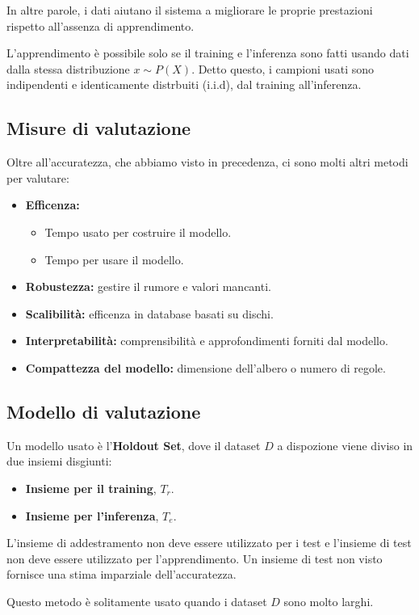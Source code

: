 In altre parole, i dati aiutano il sistema a migliorare le proprie prestazioni rispetto all'assenza di apprendimento.

\begin{note}
  L'apprendimento è possibile solo se il training e l'inferenza sono fatti usando dati dalla stessa distribuzione $x \sim P(X)$.
  Detto questo, i campioni usati sono indipendenti e identicamente distrbuiti (i.i.d), dal training all'inferenza.
\end{note}

\subsection{Misure di valutazione}
Oltre all'accuratezza, che abbiamo visto in precedenza, ci sono molti altri metodi per valutare:
\begin{itemize}
  \item \textbf{Efficenza:}
  \begin{itemize}
    \item Tempo usato per costruire il modello.
    \item Tempo per usare il modello.
  \end{itemize}
  \item \textbf{Robustezza:} gestire il rumore e valori mancanti.
  \item \textbf{Scalibilità:} efficenza in database basati su dischi.
  \item \textbf{Interpretabilità:} comprensibilità e approfondimenti forniti dal modello.
  \item \textbf{Compattezza del modello:} dimensione dell'albero o numero di regole.
\end{itemize}

\subsection{Modello di valutazione}
Un modello usato è l'\textbf{Holdout Set}, dove il dataset $D$ a dispozione viene diviso in due insiemi disgiunti:
\begin{itemize}
  \item \textbf{Insieme per il training}, $T_r$.
  \item \textbf{Insieme per l'inferenza}, $T_e$.
\end{itemize}

\begin{note}
  L'insieme di addestramento non deve essere utilizzato per i test e l'insieme di test non deve essere utilizzato per l'apprendimento.
  Un insieme di test non visto fornisce una stima imparziale dell'accuratezza.
\end{note}
Questo metodo è solitamente usato quando i dataset $D$ sono molto larghi.


